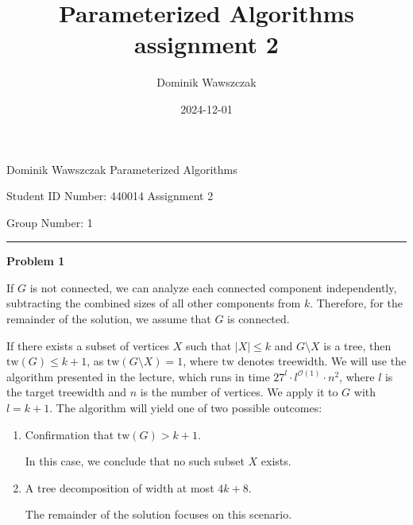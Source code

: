\documentclass[12pt]{article}
\title{Parameterized Algorithms assignment 2}
\author{Dominik Wawszczak}
\date{2024-12-01}
\begin{document}
	\setlength{\parindent}{0 cm}
	
	Dominik Wawszczak \hfill Parameterized Algorithms
	
	Student ID Number: 440014 \hfill Assignment 2
	
	Group Number: 1
	
	\bigskip
	\hrule
	\bigskip
	
	\textbf{Problem 1}
	
	\medskip
	
	If \(G\) is not connected, we can analyze each connected component
	independently, subtracting the combined sizes of all other components from
	\(k\). Therefore, for the remainder of the solution, we assume that \(G\) is
	connected.
	
	\medskip
	
	If there exists a subset of vertices \(X\) such that \(|X| \leqslant k\) and
	\(G \setminus X\) is a tree, then \(\text{tw}(G) \leqslant k + 1\), as
	\(\text{tw}(G \setminus X) = 1\), where \(\text{tw}\) denotes treewidth. We
	will use the algorithm presented in the lecture, which runs in time \(27^{l}
	\cdot l^{\mathcal{O}(1)} \cdot n^{2}\), where \(l\) is the target treewidth
	and \(n\) is the number of vertices. We apply it to \(G\) with \(l = k +
	1\). The algorithm will yield one of two possible outcomes:
	\begin{enumerate}
		\item Confirmation that \(\text{tw}(G) > k + 1\).
		      
		      In this case, we conclude that no such subset \(X\) exists.
		
		\item A tree decomposition of width at most \(4k + 8\).
		      
		      The remainder of the solution focuses on this scenario.
	\end{enumerate}
	
	\medskip
	
\end{document}
